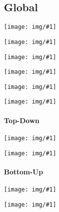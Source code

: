 \documentclass[a4paper]{report}
\newcommand{\img}[1]{\begin{center}
    \texttt{[image: img/\#1]}
\end{center} }
\begin{document}
\begin{twocolumn}
	\subsection{Global}
	\img{2/global_18}
	\img{2/global_17}
	\img{2/global_2}
	\img{2/global_7}
	\img{2/global_8}
	\img{2/global_9}
	\paragraph{Top-Down}
	\img{2/global_10}
	\img{2/global_11}
	\paragraph{Bottom-Up}
	\img{2/global_14}
	\img{2/global_15}
\end{twocolumn}
\end{document}
